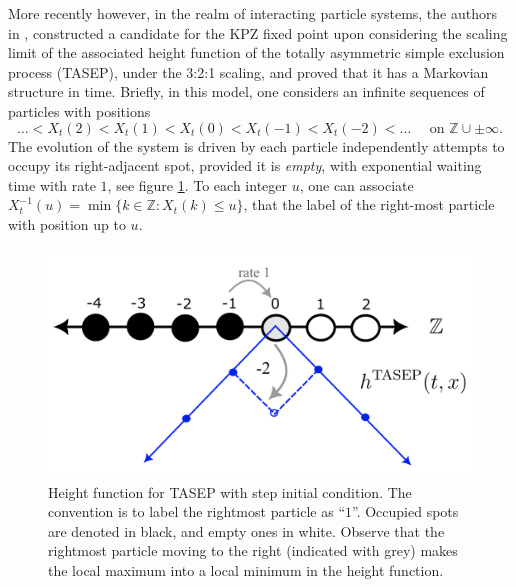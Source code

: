 \documentclass[12pt]{report}
\theoremstyle{plain}
\newcommand{\Z}{\ensuremath{\mathbb{Z}}}
\begin{document}
More recently however, in the realm of interacting particle systems, the authors in \cite{matetski2021kpz}, constructed a candidate for the KPZ fixed point upon considering the scaling limit of the associated height function of the totally asymmetric simple exclusion process (TASEP), under the 3:2:1 scaling, and proved that it has a Markovian structure in time. Briefly, in this model, one considers an infinite sequences of particles with positions
\[
\dots<X_t(2)<X_t(1)<X_t(0)<X_t(-1)<X_t(-2)<\dots \quad \text{ on } \Z\cup\pm \infty.
\] 
The evolution of the system is driven by each particle independently attempts to occupy its right-adjacent spot, provided it is \textit{empty}, with exponential waiting time with rate \(1\), see figure \ref{fig:TASEP}. To each integer \(u\), one can associate \(X^{-1}_t(u) = \min\{k\in \Z: X_t(k)\leq u\}\), that the label of the right-most particle with position up to \(u\). 

\begin{figure}[H]
    \centering
    \includegraphics[scale = 0.5]{images/TASEP.png}
    \caption{Height function for TASEP with step initial condition. The convention is to label the rightmost particle as \textquotedblleft\(1\)\textquotedblright. Occupied spots are denoted in black, and empty ones in white. Observe that the rightmost particle moving to the right (indicated with \color{black!60} grey\color{black}) makes the local maximum into a local minimum in the height function.}
    \label{fig:TASEP}
\end{figure}
\end{document}
